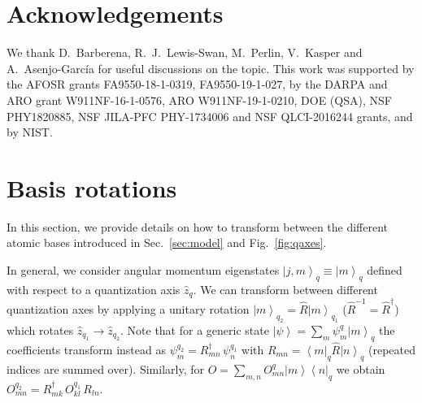 \documentclass[aps,prx,superscriptaddress,twocolumn,notitlepage,nofootinbib,longbibliography]{revtex4-2}
\newcommand{\bra}[1]{\left<#1\right|}
\newcommand{\ket}[1]{\left|#1\right>}
\newcommand{\quv}{\hat{z}}
\newcommand{\qusub}{q}
\begin{document}
\section*{Acknowledgements}

We thank D.~Barberena, R.~J.~Lewis-Swan, M.~Perlin, V.~Kasper and A.~Asenjo-Garc\'ia for useful discussions on the topic.
This work was supported by the AFOSR grants FA9550-18-1-0319, FA9550-19-1-027, by the DARPA and ARO grant W911NF-16-1-0576, ARO W911NF-19-1-0210, DOE (QSA), NSF PHY1820885, NSF JILA-PFC PHY-1734006 and NSF QLCI-2016244 grants, and by NIST.



\vfill
\newpage




\appendix







\section{Basis rotations\label{app:basis_rotations}}

In this section, we provide details on how to transform between the different atomic bases introduced in Sec.~\ref{sec:model} and Fig.~\ref{fig:qaxes}.

In general, we consider angular momentum eigenstates $\ket{j,m}_{\qusub}\equiv\ket{m}_{\qusub}$ defined with respect to a quantization axis $\quv_{\qusub}$. We can transform between different quantization axes by applying a unitary rotation $\ket{m}_{\qusub_2} = \hat{R} \ket{m}_{\qusub_1}$ ($\hat{R}^{-1}=\hat{R}^\dagger$) which rotates $\quv_{\qusub_1} \rightarrow \quv_{\qusub_2}$. Note that for a generic state $\ket{\psi}=\sum_m \psi^{\qusub}_{m} \ket{m}_{\qusub}$ the coefficients transform instead as $\psi^{\qusub_2}_m = R^\dagger_{mn}\, \psi^{\qusub_1}_n$ with $R_{mn} = \bra{m}_{\qusub} \hat{R} \ket{n}_{\qusub}$ (repeated indices are summed over).
Similarly, for $\hat{O}= \sum_{m,n} O^{\qusub}_{mn} \ket{m} \bra{n}_{\qusub}$ we obtain $O^{\qusub_2}_{mn} = R^\dagger_{mk}\, O^{\qusub_1}_{kl}\, R_{ln}$.
\end{document}
